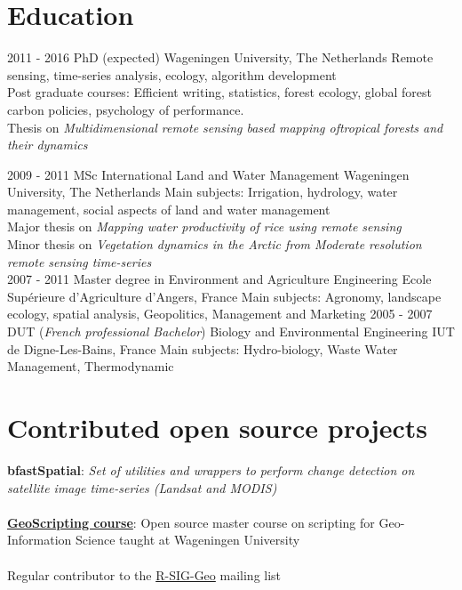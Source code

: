 \documentclass[]{friggeri-cv}
\begin{document}
\section{Education}
\begin{entrylist}
  \entry
    {2011 - 2016}
    {PhD (expected)}
    {Wageningen University, The Netherlands}
    {Remote sensing, time-series analysis, ecology, algorithm development\\
    Post graduate courses: Efficient writing, statistics, forest ecology, global forest carbon policies, psychology of performance.\\
    Thesis on \emph{Multidimensional remote sensing based mapping oftropical forests and their dynamics}\\}

  \entry
    {2009 - 2011}
    {MSc International Land and Water Management}
    {Wageningen University, The Netherlands}
    {Main subjects: Irrigation, hydrology, water management, social aspects of land and water management \\
    Major thesis on \emph{Mapping water productivity of rice using remote sensing}\\
    Minor thesis on \emph{Vegetation dynamics in the Arctic from Moderate resolution remote sensing time-series}\\}
  \entry
    {2007 - 2011}
    {Master degree in Environment and Agriculture Engineering}
    {Ecole Supérieure d'Agriculture d'Angers, France}
    {Main subjects: Agronomy, landscape ecology, spatial analysis, Geopolitics, Management and Marketing}
  \entry
    {2005 - 2007}
    {DUT (\textit{French professional Bachelor}) Biology and Environmental Engineering}
    {IUT de Digne-Les-Bains, France}
    {Main subjects: Hydro-biology, Waste Water Management, Thermodynamic}
\end{entrylist}

\section{Contributed open source projects}
    \textbf{bfastSpatial}: \textit{Set of utilities and wrappers to perform change detection on satellite image time-series (Landsat and MODIS)}\\
    \\
    \href{http://geoscripting-wur.github.io/}{\textbf{GeoScripting course}}: Open source master course on scripting for Geo-Information Science taught at Wageningen University\\
    \\
    Regular contributor to the \href{https://stat.ethz.ch/mailman/listinfo/r-sig-geo}{R-SIG-Geo} mailing list
\end{document}
